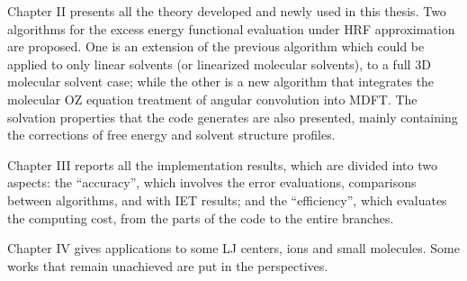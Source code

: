 Chapter II presents all the theory developed and newly used in this
thesis. Two algorithms for the excess energy functional evaluation
under \acs{HRF} approximation are proposed. One is an extension of
the previous algorithm which could be applied to only linear solvents
(or linearized molecular solvents), to a full 3D molecular solvent
case; while the other is a new algorithm that integrates the molecular
\acs{OZ} equation treatment of angular convolution into \acs{MDFT}.
The solvation properties that the code generates are also presented,
mainly containing the corrections of free energy and solvent structure
profiles.

Chapter III reports all the implementation results, which are divided
into two aspects: the ``accuracy'', which involves the error evaluations,
comparisons between algorithms, and with \acs{IET} results; and the
``efficiency'', which evaluates the computing cost, from the parts
of the code to the entire branches.

Chapter IV gives applications to some LJ centers, ions and small molecules.
Some works that remain unachieved are put in the perspectives.
